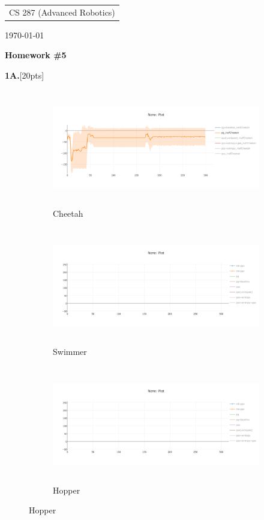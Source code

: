 \documentclass[10pt]{article}
\begin{document}
{\parindent 0pt \begin{tabular}[t]{l}
CS 287 (Advanced Robotics) \\
\end{tabular}  \hfill \today \vskip 0.2in }

\parindent 0pt
\parskip 2pt

\begin{center}
\large\bf Homework \#5 \\
\end{center}

\textbf{1A.}[20pts]
\begin{figure}[ht!]
    \centering
    \begin{subfigure}[h]{0.6\linewidth}
        \centering
        \includegraphics[height=2in]{figures/pg.png}
        \caption{Cheetah}
    \end{subfigure}
    \vskip 0.3in
    \begin{subfigure}[h]{0.6\textwidth}
        \centering
        \includegraphics[height=2in]{figures/newplot.png}
        \caption{Swimmer}
    \end{subfigure}
    \vskip 0.3in
    \begin{subfigure}[h]{0.6\textwidth}
        \centering
        \includegraphics[height=2in]{figures/newplot.png}
        \caption{Hopper}
    \end{subfigure}
\end{figure}
\end{document}
